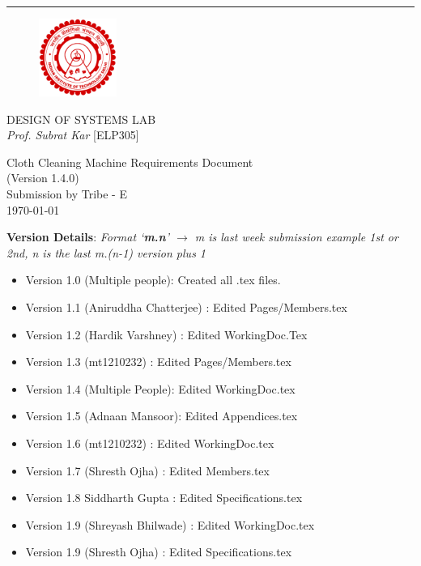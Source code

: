 \documentclass[12pt]{article}
\date{}
\def\myversion{1.4.0}
\begin{document}
\begin{center}
    
    \rule{16cm}{5pt}\vskip1cm
    \begin{bfseries}
    \begin{figure}[h]
        \centering
        \includegraphics[width=1in]{iitd_logo}
    \end{figure}

        \Huge{DESIGN OF SYSTEMS LAB }\\
        \textit{Prof. Subrat Kar} [ELP305]
        \vspace{4cm}
        
        Cloth Cleaning Machine
        Requirements Document\\
        \LARGE{(Version \myversion)}\\
        \vspace{4.5cm}
        Submission by Tribe - E\\
        \today\\
    \end{bfseries}
\end{center}
\newpage
\textbf{Version Details}: \textit{Format `\textbf{m.n}' $\rightarrow$ m is last week submission example 1st or 2nd, n is the last m.(n-1) version plus 1}
\begin{itemize}
    \item Version 1.0 (Multiple people): Created all .tex files.
    \item Version 1.1 (Aniruddha Chatterjee) : Edited Pages/Members.tex
    \item Version 1.2 (Hardik Varshney) : Edited WorkingDoc.Tex
    \item Version 1.3 (mt1210232) : Edited Pages/Members.tex    
    \item Version 1.4 (Multiple People): Edited WorkingDoc.tex
    \item Version 1.5 (Adnaan Mansoor): Edited Appendices.tex
    \item Version 1.6 (mt1210232) : Edited WorkingDoc.tex
    \item Version 1.7 (Shresth Ojha) : Edited Members.tex
    \item Version 1.8 Siddharth Gupta : Edited Specifications.tex
    \item Version 1.9 (Shreyash Bhilwade) : Edited WorkingDoc.tex
    \item Version 1.9 (Shresth Ojha) : Edited Specifications.tex
    
\end{itemize}
\newpage
\tableofcontents
\listoffigures
\end{document}
